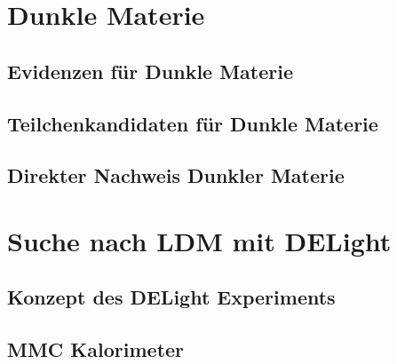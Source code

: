\documentclass{include/thesisclass}
\begin{document}
    \FrontMatter

    
    

    \begingroup \let\clearpage\relax    %
    \tableofcontents                    %
    \endgroup
    \cleardoublepage



    \MainMatter

    
    
    \chapter{Dunkle Materie}
    \section{Evidenzen für Dunkle Materie}
    
    \section{Teilchenkandidaten für Dunkle Materie}
    
    \section{Direkter Nachweis Dunkler Materie}
    
    
	\chapter{Suche nach LDM mit DELight}
	
	\section{Konzept des DELight Experiments}
	\section{MMC Kalorimeter}
	
	
\end{document}
